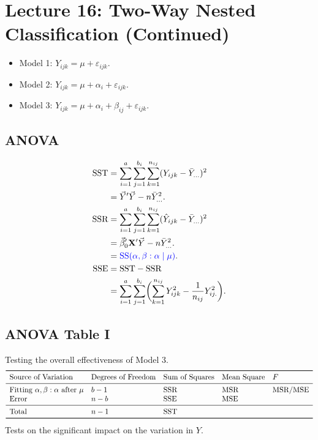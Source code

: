 \section{Lecture 16: Two-Way Nested Classification (Continued)}
\begin{itemize}
    \item Model 1: $ Y_{ijk}=\mu+\varepsilon_{ijk} $.
    \item Model 2: $ Y_{ijk}=\mu+\alpha_i+\varepsilon_{ijk} $.
    \item Model 3: $ Y_{ijk}=\mu+\alpha_i+\beta_{ij}+\varepsilon_{ijk} $.
\end{itemize}
\subsection*{ANOVA}
\begin{align*}
    \text{SST}
     & =\sum_{i=1}^{a}\sum_{j=1}^{b_i}\sum_{k=1}^{n_{ij}}(Y_{ijk}-\bar{Y}_{...})^2                          \\
     & =\vec{Y}'\vec{Y}-n\bar{Y}_{...}^2.                                                             \\
    \text{SSR}
     & =\sum_{i=1}^{a}\sum_{j=1}^{b_i}\sum_{k=1}^{n_{ij}}(\hat{Y}_{ijk}-\bar{Y}_{...})^2                    \\
     & =\vec{\beta}_0'\mathbf{X}'\vec{Y}-n\bar{Y}_{...}^2.                                            \\
     & =\textcolor{blue}{\text{SS}(\alpha,\beta:\alpha\mid \mu)}.                                           \\
    \text{SSE}
     & =\text{SST}-\text{SSR}                                                                                           \\
     & =\sum_{i=1}^{a}\sum_{j=1}^{b_i}\biggl(\sum_{k=1}^{n_{ij}}Y_{ijk}^2-\frac{1}{n_{ij}}Y_{ij.}^2\biggr).
\end{align*}
\subsection*{ANOVA Table I}
Testing the overall effectiveness of Model 3.
\[ \begin{array}{lllll}
        \toprule
        \text{Source of Variation}                          & \text{Degrees of Freedom} & \text{Sum of Squares} & \text{Mean Square} & F         \\
        \midrule
        \text{Fitting }\alpha,\beta:\alpha\text{ after }\mu & b-1                       & \SSR                  & \MSR               & \MSR/\MSE \\
        \text{Error}                                        & n-b                       & \SSE                  & \MSE                           \\
        \midrule
        \text{Total}                                        & n-1                       & \SST                                                   \\
        \bottomrule
    \end{array} \]
Tests on the significant impact on the variation in $ Y $.
